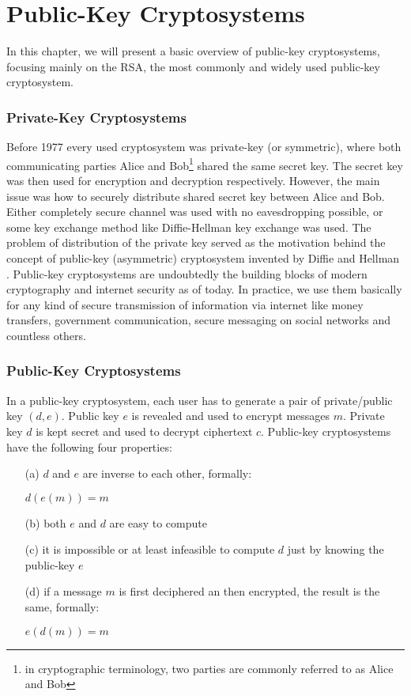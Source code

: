 \chapter{Public-Key Cryptosystems}
\label{chapter-rsa}

In this chapter, we will present a basic overview of public-key cryptosystems, focusing mainly on the RSA, the most commonly and widely used public-key cryptosystem.

\subsection*{Private-Key Cryptosystems}

Before 1977 every used cryptosystem was private-key (or symmetric), where both communicating parties Alice and Bob\footnote{in cryptographic terminology, two parties are commonly referred to as Alice and Bob} shared the same secret key. The secret key was then used for encryption and decryption respectively. However, the main issue was how to securely distribute shared secret key between Alice and Bob. Either completely secure channel was used with no eavesdropping possible, or some key exchange method like Diffie-Hellman key exchange \cite{diffie_hellman} was used. The problem of distribution of the private key served as the motivation behind the concept of public-key (asymmetric) cryptosystem invented by Diffie and Hellman \cite{diffie_hellman}. Public-key cryptosystems are undoubtedly the building blocks of modern cryptography and internet security as of today. In practice, we use them basically for any kind of secure transmission of information via internet like money transfers, government communication, secure messaging on social networks and countless others.

\subsection*{Public-Key Cryptosystems}

In a public-key cryptosystem, each user has to generate a pair of private/public key $(d,e)$. Public key $e$ is revealed and used to encrypt messages $m$. Private key $d$ is kept secret and used to decrypt ciphertext $c$. Public-key cryptosystems have the following four properties:

\begin{itemize}

	\item[(a)] $d$ and $e$ are inverse to each other, formally:

$d(e(m)) = m$

	\item[(b)] both $e$ and $d$ are easy to compute

	\item[(c)] it is impossible or at least infeasible to compute $d$ just by knowing the public-key $e$

	\item[(d)] if a message $m$ is first deciphered an then encrypted, the result is the same, formally:
    
$e(d(m)) = m$

\end{itemize}

